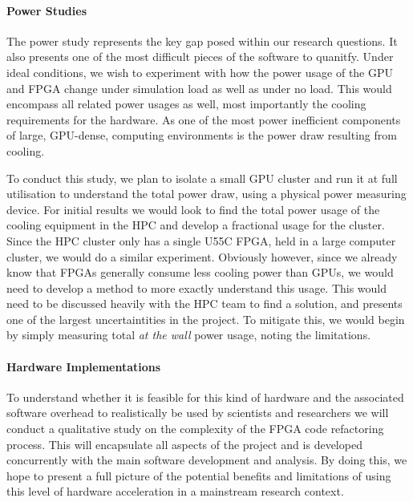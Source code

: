 \documentclass[11pt, a4paper]{article}
\begin{document}
	\paragraph{Power Studies}
	The power study represents the key gap posed within our research questions. It also presents one of the most difficult pieces of the software to quanitfy. Under ideal conditions, we wish to experiment with how the power usage of the GPU and FPGA change under simulation load as well as under no load. This would encompass all related power usages as well, most importantly the cooling requirements for the hardware. As one of the most power inefficient components of large, GPU-dense, computing environments is the power draw resulting from cooling. 
	
	To conduct this study, we plan to isolate a small GPU cluster and run it at full utilisation to understand the total power draw, using a physical power measuring device. For initial results we would look to find the total power usage of the cooling equipment in the HPC and develop a fractional usage for the cluster. Since the HPC cluster only has a single U55C FPGA, held in a large computer cluster, we would do a similar experiment. Obviously however, since we already know that FPGAs generally consume less cooling power than GPUs, we would need to develop a method to more exactly understand this usage. This would need to be discussed heavily with the HPC team to find a solution, and presents one of the largest uncertaintities in the project. To mitigate this, we would begin by simply measuring total \textit{at the wall} power usage, noting the limitations. 
	
	\paragraph{Hardware Implementations}
	To understand whether it is feasible for this kind of hardware and the associated software overhead to realistically be used by scientists and researchers we will conduct a qualitative study on the complexity of the FPGA code refactoring process. This will encapsulate all aspects of the project and is developed concurrently with the main software development and analysis. By doing this, we hope to present a full picture of the potential benefits and limitations of using this level of hardware acceleration in a mainstream research context. 
	
	\newpage
	\appendix
	
	\newpage
\end{document}
